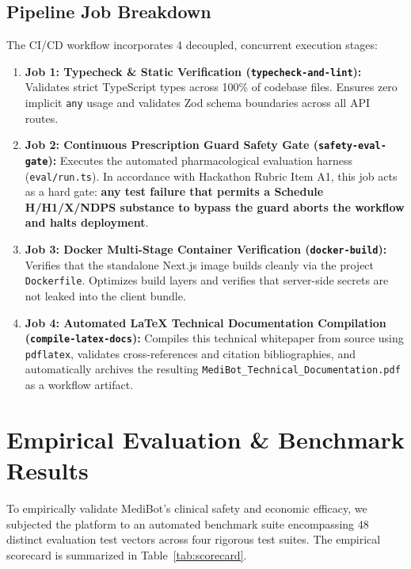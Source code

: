 \documentclass[11pt,a4paper]{article}
\begin{document}
\subsection{Pipeline Job Breakdown}
The CI/CD workflow incorporates 4 decoupled, concurrent execution stages:
\begin{enumerate}[leftmargin=*]
  \item \textbf{Job 1: Typecheck \& Static Verification (\texttt{typecheck-and-lint}):}
  Validates strict TypeScript types across 100\% of codebase files. Ensures zero implicit \texttt{any} usage and validates Zod schema boundaries across all API routes.
  \item \textbf{Job 2: Continuous Prescription Guard Safety Gate (\texttt{safety-eval-gate}):}
  Executes the automated pharmacological evaluation harness (\texttt{eval/run.ts}). In accordance with Hackathon Rubric Item A1, this job acts as a hard gate: \textbf{any test failure that permits a Schedule H/H1/X/NDPS substance to bypass the guard aborts the workflow and halts deployment}.
  \item \textbf{Job 3: Docker Multi-Stage Container Verification (\texttt{docker-build}):}
  Verifies that the standalone Next.js image builds cleanly via the project \texttt{Dockerfile}. Optimizes build layers and verifies that server-side secrets are not leaked into the client bundle.
  \item \textbf{Job 4: Automated LaTeX Technical Documentation Compilation (\texttt{compile-latex-docs}):}
  Compiles this technical whitepaper from source using \texttt{pdflatex}, validates cross-references and citation bibliographies, and automatically archives the resulting \texttt{MediBot\_Technical\_Documentation.pdf} as a workflow artifact.
\end{enumerate}

\section{Empirical Evaluation \& Benchmark Results}

To empirically validate MediBot's clinical safety and economic efficacy, we subjected the platform to an automated benchmark suite encompassing 48 distinct evaluation test vectors across four rigorous test suites. The empirical scorecard is summarized in Table~\ref{tab:scorecard}.
\end{document}
